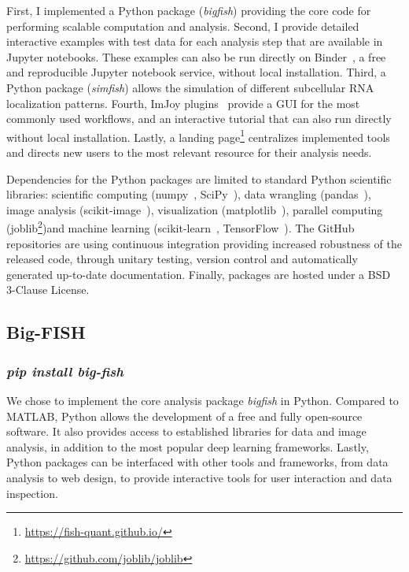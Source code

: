 First, I implemented a Python package (\emph{bigfish}) providing the core code for performing scalable computation and analysis.
Second, I provide detailed interactive examples with test data for each analysis step that are available in Jupyter notebooks.
These examples can also be run directly on Binder~\cite{Jupyter2018Binder2}, a free and reproducible Jupyter notebook service, without local installation.
Third, a Python package (\emph{simfish}) allows the simulation of different subcellular \ac{RNA} localization patterns.
Fourth, ImJoy plugins~\cite{ouyang_imjoy_2019} provide a \ac{GUI} for the most commonly used workflows, and an interactive tutorial that can also run directly without local installation.
Lastly, a landing page\footnote{\url{https://fish-quant.github.io/}} centralizes implemented tools and directs new users to the most relevant resource for their analysis needs.

Dependencies for the Python packages are limited to standard Python scientific libraries: scientific computing (numpy~\cite{2020NumPy}, SciPy~\cite{2020SciPy}), data wrangling (pandas~\cite{mckinney_pandas_2010}), image analysis (scikit-image~\cite{walt_scikit-image_2014}), visualization (matplotlib~\cite{hunter_matplotlib_2007}), parallel computing (joblib\footnote{\url{https://github.com/joblib/joblib}})and machine learning (scikit-learn~\cite{pedregosa11a_scikitlearn}, TensorFlow~\cite{tensorflow_2015}).
The GitHub repositories are using continuous integration providing increased robustness of the released code, through unitary testing, version control and automatically generated up-to-date documentation.
Finally, packages are hosted under a BSD 3-Clause License.

\subsection{Big-FISH}
\label{subsec:bigfish}

\subsubsection{\emph{pip install big-fish}}
We chose to implement the core analysis package \emph{bigfish} in Python.
Compared to MATLAB, Python allows the development of a free and fully open-source software.
It also provides access to established libraries for data and image analysis, in addition to the most popular deep learning frameworks.
Lastly, Python packages can be interfaced with other tools and frameworks, from data analysis to web design, to provide interactive tools for user interaction and data inspection.

